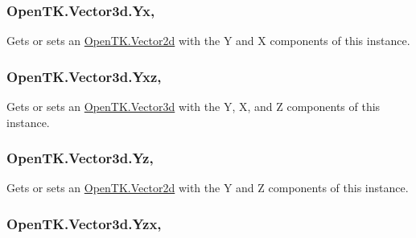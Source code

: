 \hypertarget{struct_open_t_k_1_1_vector3d_a2085dfeb2b1f46e06bbf5429369cf473}{
\subsubsection[{Yx}]{ Open\-T\-K.\-Vector3d.\-Yx\hspace{0.3cm}{\ttfamily [get]}, {\ttfamily [set]}}}\label{struct_open_t_k_1_1_vector3d_a2085dfeb2b1f46e06bbf5429369cf473}


Gets or sets an \hyperlink{struct_open_t_k_1_1_vector2d}{Open\-T\-K.\-Vector2d} with the Y and X components of this instance. 

\hypertarget{struct_open_t_k_1_1_vector3d_a2ae98c94c4978c88492ff24351b40941}{
\subsubsection[{Yxz}]{ Open\-T\-K.\-Vector3d.\-Yxz\hspace{0.3cm}{\ttfamily [get]}, {\ttfamily [set]}}}\label{struct_open_t_k_1_1_vector3d_a2ae98c94c4978c88492ff24351b40941}


Gets or sets an \hyperlink{struct_open_t_k_1_1_vector3d}{Open\-T\-K.\-Vector3d} with the Y, X, and Z components of this instance. 

\hypertarget{struct_open_t_k_1_1_vector3d_aa4e666b501c263a4dbc03f2aadee8c18}{
\subsubsection[{Yz}]{ Open\-T\-K.\-Vector3d.\-Yz\hspace{0.3cm}{\ttfamily [get]}, {\ttfamily [set]}}}\label{struct_open_t_k_1_1_vector3d_aa4e666b501c263a4dbc03f2aadee8c18}


Gets or sets an \hyperlink{struct_open_t_k_1_1_vector2d}{Open\-T\-K.\-Vector2d} with the Y and Z components of this instance. 

\hypertarget{struct_open_t_k_1_1_vector3d_acbf0f74c431fac06fb539f935a3e82cc}{
\subsubsection[{Yzx}]{ Open\-T\-K.\-Vector3d.\-Yzx\hspace{0.3cm}{\ttfamily [get]}, {\ttfamily [set]}}}\label{struct_open_t_k_1_1_vector3d_acbf0f74c431fac06fb539f935a3e82cc}


